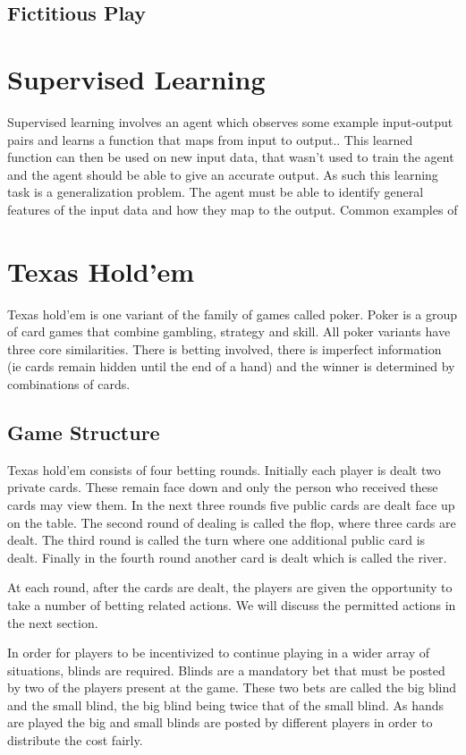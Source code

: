 \subsection{Fictitious Play}\label{subsec:fictitiousPlay}


\section{Supervised Learning}\label{sec:supervisedLearning}
Supervised learning involves an agent which observes some example input-output pairs and learns
a function that maps from input to output.\citep{russell2016artificial}.
This learned function can then be used on new input data, that wasn't used to train the agent and the
agent should be able to give an accurate output.
As such this learning task is a generalization problem.
The agent must be able to identify general features of the input data and how they map to the output.
Common examples of


\section{Texas Hold'em}\label{sec:thIntro}
Texas hold'em is one variant of the family of games called poker.
Poker is a group of card games that combine gambling, strategy and skill.
All poker variants have three core similarities.
There is betting involved, there is imperfect information (ie cards remain hidden until the end of a hand)
and the winner is determined by combinations of cards.

\subsection{Game Structure}\label{subsec:bettingRounds}
Texas hold'em consists of four betting rounds.
Initially each player is dealt two private cards.
These remain face down and only the person who received these cards may view them.
In the next three rounds five public cards are dealt face up on the table.
The second round of dealing is called the flop, where three cards are dealt.
The third round is called the turn where one additional public card is dealt.
Finally in the fourth round another card is dealt which is called the river.

At each round, after the cards are dealt, the players are given the opportunity to take a number of betting
related actions.
We will discuss the permitted actions in the next section.

In order for players to be incentivized to continue playing in a wider array of situations, blinds are required.
Blinds are a mandatory bet that must be posted by two of the players present at the game.
These two bets are called the big blind and the small blind, the big blind being twice that of the small blind.
As hands are played the big and small blinds are posted by different players in order to distribute the cost fairly.

